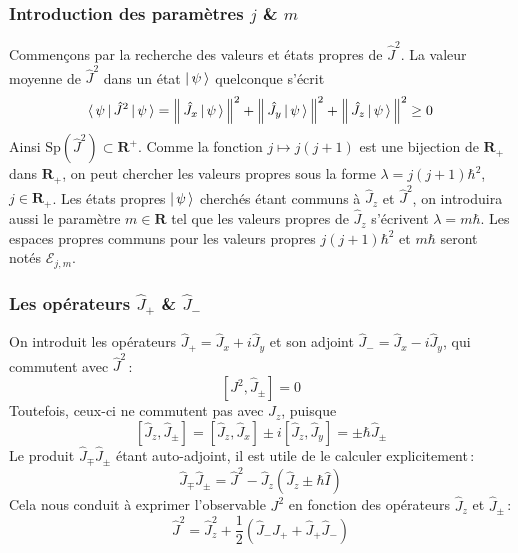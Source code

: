 \subsubsection{Introduction des paramètres $j$ \& $m$}

Commençons par la recherche des valeurs et états propres de $\hat{J}^2$. La valeur moyenne de $\hat{J}^2$ dans un état $\left| \, \psi \, \right> $ quelconque s’écrit
\[ \left< \, \psi \, \right| \hat{J}^2 \left| \, \psi \, \right> = \left\lVert \, \hat{J}_x \left| \, \psi \, \right> \, \right\rVert^2 + \left\lVert \, \hat{J}_y \left| \, \psi \, \right>  \, \right\rVert^2 + \left\lVert \, \hat{J}_z \left| \, \psi \, \right>  \, \right\rVert^2 \geq 0 \]
Ainsi $\text{Sp}(\hat{J}^2) \subset \mathbf{R}^+$. Comme la fonction $j \mapsto j(j+1)$ est une bijection de $\mathbf{R}_+$ dans $\mathbf{R}_+$, on peut chercher les valeurs propres sous la forme $\lambda = j(j+1)\hbar^2$, $j \in \mathbf{R}_+$. Les états propres $\left| \, \psi \, \right> $ cherchés étant communs à $\hat{J}_z$ et $\hat{J}^2$, on introduira aussi le paramètre $m \in \mathbf{R}$ tel que les valeurs propres de $\hat{J}_z$ s’écrivent $\lambda = m \hbar$. Les espaces propres communs pour les valeurs propres $j(j+1)\hbar^2$ et $m\hbar$ seront notés $\mathcal{E}_{j,m}$.

\subsubsection{Les opérateurs $\hat{J}_+$ \& $\hat{J}_-$}

On introduit les opérateurs $\hat{J}_+ = \hat{J}_x + i \hat{J}_y$ et son adjoint $\hat{J}_- = \hat{J}_x - i \hat{J}_y$, qui commutent avec $\hat{J}^2$ :
\[ \left[J^2, \hat{J}_{\pm}\right]   = 0 \]
Toutefois, ceux-ci ne commutent pas avec $\hat{J}_z$, puisque
\[ \left[\hat{J}_z, \hat{J}_{\pm}\right] = \left[\hat{J}_z, \hat{J}_x\right] \pm i \left[\hat{J}_z, \hat{J}_y\right] = \pm \hbar \hat{J}_{\pm} \]
Le produit $\hat{J}_{\mp}\hat{J}_{\pm}$ étant auto-adjoint, il est utile de le calculer explicitement :
\[ \hat{J}_{\mp}\hat{J}_{\pm} = \hat{J}^2 - \hat{J}_z (\hat{J}_z \pm \hbar \hat{I}) \]
Cela nous conduit à exprimer l’observable $J^2$ en fonction des opérateurs $\hat{J}_z$ et $\hat{J}_{\pm}$ :
\[ \hat{J}^2 = \hat{J}_z^2 + \frac{1}{2} \left(\hat{J}_- \hat{J}_+ + \hat{J}_+ \hat{J}_-\right) \]

